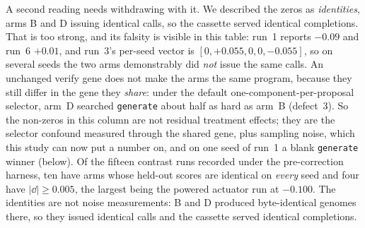 \documentclass[11pt]{article}
\begin{document}
A second reading needs withdrawing with it. We
described the zeros as \emph{identities}, arms B and D issuing identical calls, so the
cassette served identical completions. That is too strong, and its falsity is visible in this
table: run~1 reports $-0.09$ and run~6 $+0.01$, and run~3's per-seed vector is
$[0,+0.055,0,0,-0.055]$, so on several seeds the two arms demonstrably did \emph{not} issue the
same calls. An unchanged verify gene does not make the arms the same program, because they
still differ in the gene they \emph{share}: under the default one-component-per-proposal
selector, arm~D searched \texttt{generate} about half as hard as arm~B (defect~3). So the
non-zeros in this column are not residual treatment effects; they are the selector confound
measured through the shared gene, plus sampling noise, which this study can now put a number on,
and on one seed of run~1 a blank \texttt{generate} winner (below).
Of the
fifteen contrast runs recorded under the pre-correction harness, ten have arms whose held-out scores are
identical on \emph{every} seed and four have $|\dd| \ge 0.005$, the largest being the powered actuator run at
$-0.100$. The identities are not noise measurements: B and D produced byte-identical genomes
there, so they issued identical calls and the cassette served identical completions.
\end{document}
